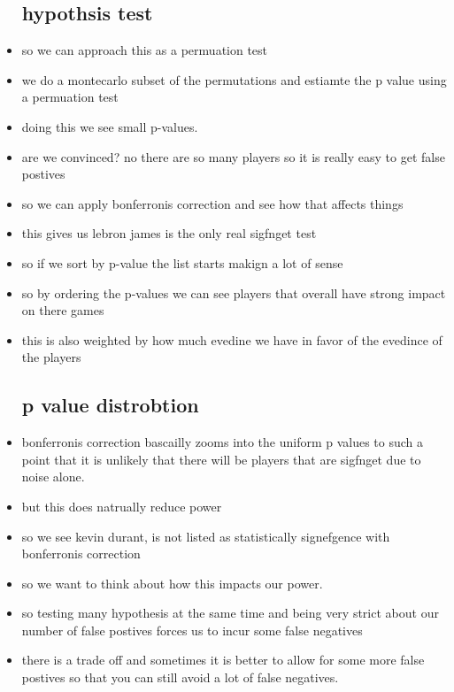 \documentclass{article}
\begin{document}
\begin{itemize}
\subsection*{hypothsis test}
\item so we can approach this as a permuation test 
\item we do a montecarlo subset of the permutations and estiamte the p value using a permuation test 
\item doing this we see small p-values. 
\item are we convinced? no there are so many players so it is really easy to get false postives
\item so we can apply bonferronis correction and see how that affects things 
\item this gives us lebron james is the only real sigfnget test 
\item so if we sort by p-value the list starts makign a lot of sense 
\item so by ordering the p-values we can see players that overall have strong impact on there games
\item this is also weighted by how much evedine we have in favor of the evedince of the players
\subsection*{p value distrobtion}
\item bonferronis correction bascailly zooms into the uniform p values to such a point that it is unlikely that there will be players that are sigfnget due to noise alone. 
\item but this does natrually reduce power
\item so we see kevin durant, is not listed as statistically signefgence with bonferronis correction
\item so we want to think about how this impacts our power. 
\item so testing many hypothesis at the same time and being very strict about our number of false postives forces us to incur some false negatives 
\item there is a trade off and sometimes it is better to allow for some more false postives so that you can still avoid a lot of false negatives. 
\end{itemize}
\end{document}
